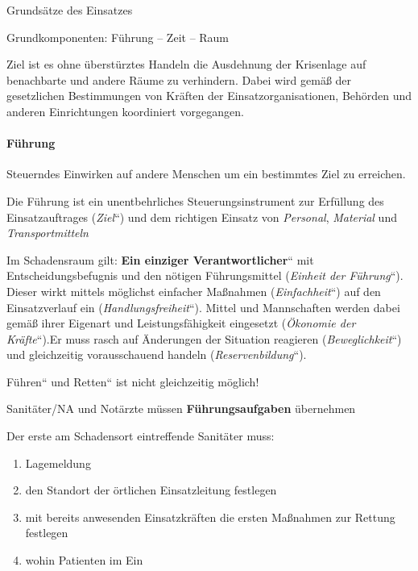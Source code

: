 \documentclass{article}
\newcommand\gEs[1]{\textbf{\textcolor[rgb]{0.0,0.0,0.5019608}{#1}}}
\newcommand\gEs[1]{\textbf{\textcolor[rgb]{0.0,0.0,0.5019608}{#1}}}
\newcommand\gE[1]{\textit{#1}}
\begin{document}
{\mdseries\color[rgb]{0.0,0.0,0.5019608}
Grunds\"atze des Einsatzes}

{\mdseries
Grundkomponenten: F\"uhrung -- Zeit -- Raum }

{\mdseries
Ziel ist es ohne \"uberst\"urztes Handeln die Ausdehnung der Krisenlage
auf benachbarte und andere R\"aume zu verhindern. Dabei wird
gem\"a{\ss} der gesetzlichen Bestimmungen von Kr\"aften der
Einsatzorganisationen, Beh\"orden und anderen Einrichtungen koordiniert
vorgegangen.}

\paragraph{F\"uhrung}
{\mdseries
Steuerndes Einwirken auf andere Menschen um ein bestimmtes Ziel zu
erreichen. }

{\mdseries
Die F\"uhrung ist ein unentbehrliches Steuerungsinstrument zur
Erf\"ullung des Einsatzauftrages
({\quotedblbase}\gE{Ziel}{\textquotedblleft}) und dem
richtigen Einsatz von \gE{Personal},
\gE{Material} und \gE{Transportmitteln} }

{\mdseries
Im Schadensraum gilt: {\quotedblbase}\gEs{Ein
einziger Verantwortlicher}{\textquotedblleft} mit Entscheidungsbefugnis
und den n\"otigen F\"uhrungsmittel
({\quotedblbase}\gE{Einheit der
F\"uhrung}{\textquotedblleft}). Dieser wirkt mittels m\"oglichst
einfacher Ma{\ss}nahmen
({\quotedblbase}\gE{Einfachheit}{\textquotedblleft}) auf
den Einsatzverlauf ein
({\quotedblbase}\gE{Handlungsfreiheit}{\textquotedblleft}).
Mittel und Mannschaften werden dabei gem\"a{\ss} ihrer Eigenart und
Leistungsf\"ahigkeit eingesetzt
({\quotedblbase}\gE{\"Okonomie der
Kr\"afte}{\textquotedblleft}).Er muss rasch auf \"Anderungen der
Situation reagieren
({\quotedblbase}\gE{Beweglichkeit}{\textquotedblleft})
und gleichzeitig vorausschauend handeln
({\quotedblbase}\gE{Reservenbildung}{\textquotedblleft}).}

{\mdseries\color{black}
{\quotedblbase}F\"uhren{\textquotedblleft} und
{\quotedblbase}Retten{\textquotedblleft} ist nicht gleichzeitig
m\"oglich!}

{\mdseries\color{black}
Sanit\"ater/NA und Not\"arzte m\"ussen
\gEs{F\"uhrungsaufgaben} \"ubernehmen}

{\mdseries
%
%
Der erste am Schadensort eintreffende Sanit\"ater muss:}

\begin{enumerate}
\item Lagemeldung

\item den Standort der \"ortlichen Einsatzleitung festlegen

\item mit bereits anwesenden Einsatzkr\"aften die ersten Ma{\ss}nahmen
zur Rettung festlegen

\item wohin Patienten im Ein

\end{enumerate}
\end{document}
